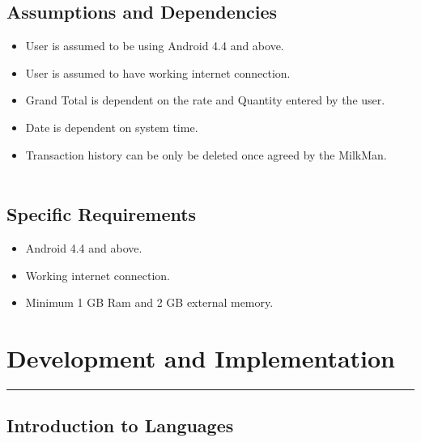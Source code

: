 \section{Assumptions and Dependencies}
\begin{itemize}
	\item User is assumed to be using Android 4.4 and above.
	\item User is assumed to have working internet connection.
	\item Grand Total is dependent on the rate and Quantity entered by the user.
	\item Date is dependent on system time. 
	\item Transaction history can be only be deleted once agreed by the MilkMan. \\
	\\
\end{itemize}
\section{Specific Requirements}
\begin{itemize}
	\item Android 4.4 and above.
	\item Working internet connection.
	\item Minimum 1 GB Ram and 2 GB external memory.
\end{itemize}
\chapter{Development and Implementation}\hrule
\label{Chapter:4}
\section{Introduction to Languages}

